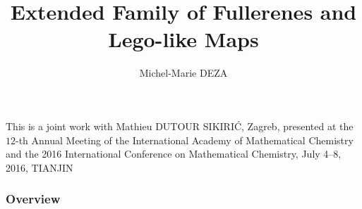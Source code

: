 \documentclass{beamer}
\title[Extended famil]{Extended Family  of Fullerenes and Lego-like Maps}
\author{Michel-Marie DEZA}
\institute{Ecole Normale Superieure, Paris}
\date{}
\begin{document}
\begin{frame}
\titlepage
\begin{center}
This is a joint work with Mathieu DUTOUR SIKIRI\'{C}, Zagreb,  
presented at the  $12$-th Annual Meeting of the International Academy of Mathematical Chemistry and the 2016 International Conference on Mathematical Chemistry, 
 July 4--8, 2016, TIANJIN


\end{center}
\end{frame}

\begin{frame}
\frametitle{Overview} \tableofcontents
\end{frame}
\end{document}
